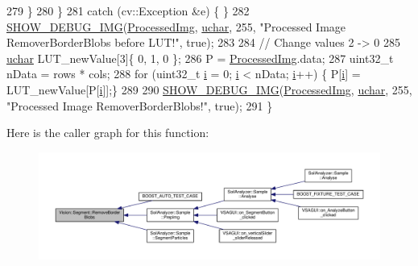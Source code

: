 \begin{DoxyCode}
279             \}
280         \}
281         \textcolor{keywordflow}{catch} (cv::Exception &e) \{ \}
282         \hyperlink{_vision_debug_8h_aae864fa4f990213a4184a209ff236202}{SHOW\_DEBUG\_IMG}(\hyperlink{class_vision_1_1_image_processing_aa7d65742882cd1b2a1e4e9cb68809211}{ProcessedImg}, \hyperlink{_soil_math_types_8h_a65f85814a8290f9797005d3b28e7e5fc}{uchar}, 255, \textcolor{stringliteral}{"Processed Image
       RemoverBorderBlobs before LUT!"}, \textcolor{keyword}{true});
283 
284         \textcolor{comment}{// Change values 2 -> 0}
285         \hyperlink{_soil_math_types_8h_a65f85814a8290f9797005d3b28e7e5fc}{uchar} LUT\_newValue[3]\{ 0, 1, 0 \};
286         P = \hyperlink{class_vision_1_1_image_processing_aa7d65742882cd1b2a1e4e9cb68809211}{ProcessedImg}.data;
287         uint32\_t nData = rows * cols;
288         \textcolor{keywordflow}{for} (uint32\_t \hyperlink{_comparision_pictures_2_createtest_image_8m_a6f6ccfcf58b31cb6412107d9d5281426}{i} = 0; \hyperlink{_comparision_pictures_2_createtest_image_8m_a6f6ccfcf58b31cb6412107d9d5281426}{i} < nData; \hyperlink{_comparision_pictures_2_createtest_image_8m_a6f6ccfcf58b31cb6412107d9d5281426}{i}++) \{ P[\hyperlink{_comparision_pictures_2_createtest_image_8m_a6f6ccfcf58b31cb6412107d9d5281426}{i}] = LUT\_newValue[P[\hyperlink{_comparision_pictures_2_createtest_image_8m_a6f6ccfcf58b31cb6412107d9d5281426}{i}]];\}
289 
290         \hyperlink{_vision_debug_8h_aae864fa4f990213a4184a209ff236202}{SHOW\_DEBUG\_IMG}(\hyperlink{class_vision_1_1_image_processing_aa7d65742882cd1b2a1e4e9cb68809211}{ProcessedImg}, \hyperlink{_soil_math_types_8h_a65f85814a8290f9797005d3b28e7e5fc}{uchar}, 255, \textcolor{stringliteral}{"Processed Image
       RemoverBorderBlobs!"}, \textcolor{keyword}{true});
291     \}
\end{DoxyCode}


Here is the caller graph for this function\+:\nopagebreak
\begin{figure}[H]
\begin{center}
\leavevmode
\includegraphics[width=350pt]{class_vision_1_1_segment_a65a50340b5a1a0fb08a1b5749b7145b6_icgraph}
\end{center}
\end{figure}


